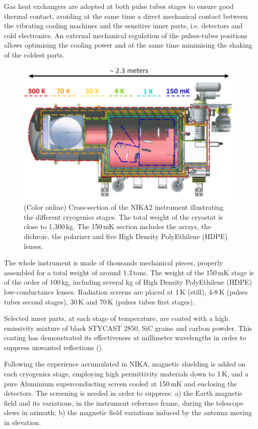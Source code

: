 \documentclass[]{aa} %
\begin{document}
Gas heat exchangers are adopted at both pulse tubes stages to ensure good thermal contact, avoiding at the same time a direct mechanical contact between the vibrating cooling machines and the sensitive inner parts, i.e. detectors and cold electronics. An external mechanical regulation of the pulses-tubes positions allows optimising the cooling power and at the same time minimising the shaking of the coldest parts. 

\begin{figure}[h]
   \centering
   \includegraphics[width=.95\linewidth]{NIKA2_cryoStages.png}
      \caption{(Color online) Cross-section of the NIKA2 instrument illustrating the different cryogenics stages. The total weight of the cryostat is close to 1,300\,kg. The 150\,mK section includes the arrays, the dichroic, the polarizer and five High Density PolyEthilene (HDPE) lenses.}
         \label{Cryostat_cryo}
\end{figure}

The whole instrument is made of thousands mechanical pieces, properly assembled for a total weight of around 1.3\,tons. The weight of the 150\,mK stage is of the order of 100\,kg, including several kg of High Density PolyEthilene (HDPE) low-conductance lenses. Radiation screens are placed at 1\,K (still), 4-8\,K (pulses tubes second stages), 30\,K and 70\,K (pulses tubes first stages).

Selected inner parts, at each stage of temperature, are coated with a high emissivity mixture of black STYCAST 2850, SiC grains and carbon powder. This coating has demonstrated its effectiveness at millimeter wavelengths in order to suppress unwanted reflections (\cite{Calvo2010}).

Following the experience accumulated in NIKA, magnetic shielding is added on each cryogenics stage, employing high permittivity materials down to 1\,K, and a pure Aluminium superconducting screen cooled at 150\,mK and enclosing the detectors. The screening is needed in order to suppress: a) the Earth magnetic field and its variations, in the instrument reference frame, during the telescope slews in azimuth; b) the magnetic field variations induced by the antenna moving in elevation. 
\end{document}

